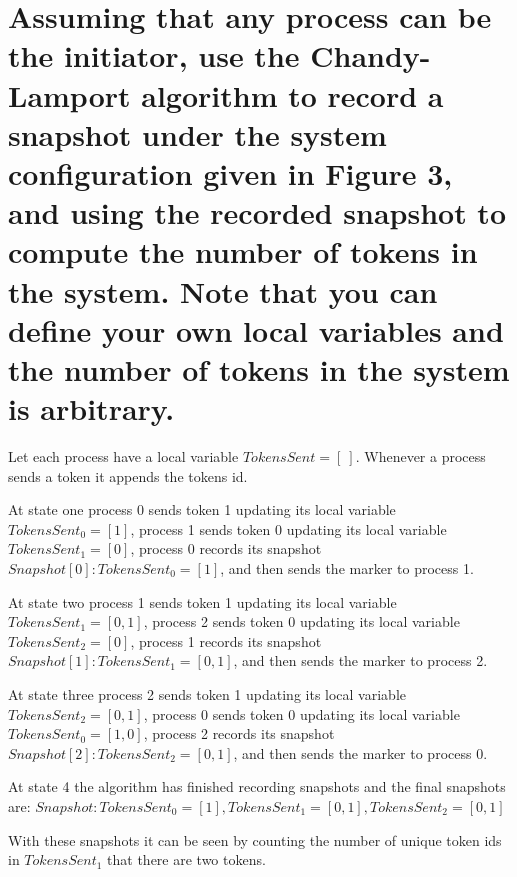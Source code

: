 \documentclass[times]{article}
\begin{document}
	\pagebreak
	\section{Assuming that any process can be the initiator, use the Chandy-Lamport algorithm to record a snapshot under the system configuration given in Figure 3, and using the recorded snapshot to compute the number of tokens in the system. Note that you can define your own local variables and the number of tokens in the system is arbitrary.}
	
	Let each process have a local variable $TokensSent=[\ ]$. Whenever a process sends a token it appends the tokens id. 
	
	At state one process 0 sends token 1 updating its local variable $TokensSent_0=[1]$, process 1 sends token 0 updating its local variable $TokensSent_1=[0]$, process 0 records its snapshot $Snapshot[0]: TokensSent_0=[1]$, and then sends the marker to process 1. 
	
	At state two process 1 sends token 1 updating its local variable $TokensSent_1=[0,1]$, process 2 sends token 0 updating its local variable $TokensSent_2=[0]$, process 1 records its snapshot $Snapshot[1]: TokensSent_1=[0,1]$, and then sends the marker to process 2. 
	
	At state three process 2 sends token 1 updating its local variable $TokensSent_2=[0,1]$, process 0 sends token 0 updating its local variable $TokensSent_0=[1,0]$, process 2 records its snapshot $Snapshot[2]: TokensSent_2=[0,1]$, and then sends the marker to process 0.
	
	At state 4 the algorithm has finished recording snapshots and the final snapshots are: $Snapshot: TokensSent_0=[1],TokensSent_1=[0,1],TokensSent_2=[0,1]$
	
	With these snapshots it can be seen by counting the number of unique token ids in $TokensSent_1$ that there are two tokens.
\end{document}
